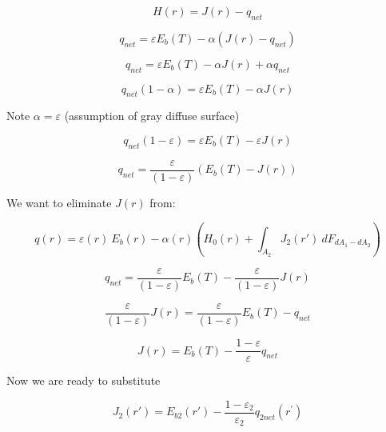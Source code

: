 \documentclass[12pt]{article}
\renewcommand{\_}{\kern-1.5pt\textunderscore\kern-1.5pt}
\begin{document}
 \[ H \left( r \right) =J \left( r \right) -q_{net} \] \par

 \[ q_{net} = \varepsilon  E_{b} \left( T \right) - \alpha  \left( J \left( r \right) -q_{net} \right)  \] \par

 \[ q_{net} = \varepsilon  E_{b} \left( T \right) - \alpha J \left( r \right) + \alpha q_{net} \] \par

 \[ q_{net} \left( 1- \alpha  \right) = \varepsilon  E_{b} \left( T \right) - \alpha J \left( r \right)  \] \par

Note  \(  \alpha = \varepsilon  \)  (assumption of gray diffuse surface)\par

 \[ q_{net} \left( 1- \varepsilon  \right) = \varepsilon  E_{b} \left( T \right) - \varepsilon J \left( r \right)  \] \par

 \[ q_{net}=\frac{ \varepsilon }{ \left( 1- \varepsilon  \right) } \left( E_{b} \left( T \right) -J \left( r \right)  \right)  \] \par

We want to eliminate  \( J \left( r \right)  \)  from:\par

 \[ q \left( r \right) = \varepsilon  \left( r \right) ~E_{b} \left( r \right) - \alpha  \left( r \right)  \left( H_{0} \left( r \right)  + \int _{A_{2}}^{}J_{2} \left( r' \right) ~dF_{dA_{1}-dA_{2}} \right)  \] \par

 \[ q_{net}=\frac{ \varepsilon }{ \left( 1- \varepsilon  \right) }E_{b} \left( T \right) -\frac{ \varepsilon }{ \left( 1- \varepsilon  \right) }J \left( r \right)  \] \par

 \[ \frac{ \varepsilon }{ \left( 1- \varepsilon  \right) }J \left( r \right) =\frac{ \varepsilon }{ \left( 1- \varepsilon  \right) }E_{b} \left( T \right) -q_{net} \] \par

 \[ J \left( r \right) =E_{b} \left( T \right) -\frac{1- \varepsilon }{ \varepsilon }q_{net} \] \par

Now we are ready to substitute\par

 \[ J_{2} \left( r' \right) =E_{b2} \left( r' \right) -\frac{1- \varepsilon _{2}}{ \varepsilon _{2}}q_{2net} \left( r^{'} \right)  \] \par
\end{document}
